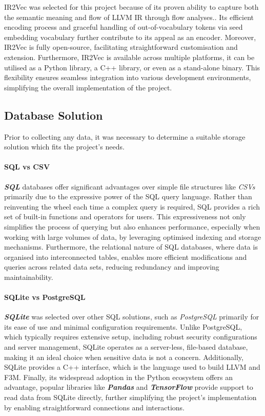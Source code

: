IR2Vec was selected for this project because of its proven ability to capture both the semantic meaning and flow of LLVM IR through flow analyses.\cite{IR2Vec}. Its efficient encoding process and graceful handling of out-of-vocabulary tokens via seed embedding vocabulary further contribute to its appeal as an encoder. Moreover, IR2Vec is fully open-source, facilitating straightforward customisation and extension. Furthermore, IR2Vec is available across multiple platforms, it can be utilised as a Python library, a C++ library, or even as a stand-alone binary. This flexibility ensures seamless integration into various development environments, simplifying the overall implementation of the project.

\subsection{Database Solution}
Prior to collecting any data, it was necessary to determine a suitable storage solution which fits the project's needs.

\paragraph{SQL vs CSV} \textbf{\textit{SQL}} databases offer significant advantages over simple file structures like \textit{CSVs} primarily due to the expressive power of the SQL query language. Rather than reinventing the wheel each time a complex query is required, SQL provides a rich set of built-in functions and operators for users. This expressiveness not only simplifies the process of querying but also enhances performance, especially when working with large volumes of data, by leveraging optimised indexing and storage mechanisms. Furthermore, the relational nature of SQL databases, where data is organised into interconnected tables, enables more efficient modifications and queries across related data sets, reducing redundancy and improving maintainability.

\paragraph{SQLite vs PostgreSQL} \textbf{\textit{SQLite}} was selected over other SQL solutions, such as \textit{PostgreSQL} primarily for its ease of use and minimal configuration requirements. Unlike PostgreSQL, which typically requires extensive setup, including robust security configurations and server management, SQLite operates as a server-less, file-based database, making it an ideal choice when sensitive data is not a concern. Additionally, SQLite provides a C++ interface, which is the language used to build LLVM and F3M. Finally, its widespread adoption in the Python ecosystem offers an advantage, popular libraries like \textbf{\textit{Pandas}} and \textbf{\textit{TensorFlow}} provide support to read data from SQLite directly, further simplifying the project's implementation by enabling straightforward connections and interactions.

